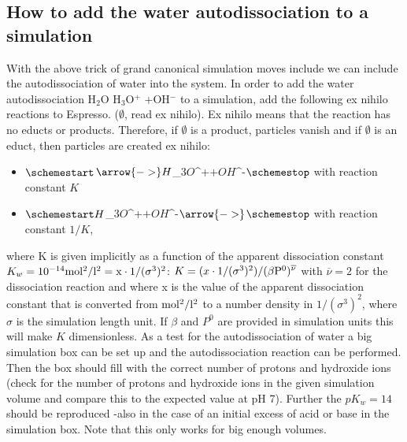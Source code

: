 \subsection{How to add the water autodissociation to a simulation}
With the above trick of grand canonical simulation moves include we can include the autodissociation of water into the system.
In order to add the water autodissociation  H$_2$O \arrow{<=>} H$_3$O$^+$ +OH$^-$ \schemestop  to a simulation, add the following ex nihilo reactions to Espresso. ($\emptyset$, read ex nihilo). Ex nihilo means that the reaction has no educts or products. Therefore, if $\emptyset$ is a product, particles vanish and if $\emptyset$ is an educt, then particles are created ex nihilo:
\begin{itemize}
\item $\schemestart $\emptyset$ \arrow{->} H$_3$O$^+$ + OH$^-$\schemestop$ with reaction constant $K$
\item $\schemestart H$_3$O$^+$ + OH$^-$ \arrow{->} $\emptyset$ \schemestop$ with reaction constant $1/K$,
\end{itemize}
where K is given implicitly as a function of the apparent dissociation constant $K_w=10^{-14} \rm{mol^2/l^2}=x\cdot \rm{1/(\sigma^3)^2}$: $K=(x\cdot \rm{1/(\sigma^3)^2})/(\beta P^0)^{\overline{\nu}}$ with $\overline{\nu}=2$ for the dissociation reaction and where x is the value of the apparent dissociation constant that is converted from $\rm{mol^2/l^2}$ to a number density in $1/(\sigma^3)^2$, where $\sigma$ is the simulation length unit. If $\beta$ and $P^0$ are provided in simulation units this will make $K$ dimensionless. 
As a test for the autodissociation of water a big simulation box can be set up and the autodissociation reaction can be performed. Then the box should fill with the correct number of protons and hydroxide ions (check for the number of protons and hydroxide ions in the given simulation volume and compare this to the expected value at pH 7). Further the $pK_w=14$ should be reproduced -also in the case of an initial excess of acid or base in the simulation box. Note that this only works for big enough volumes.

